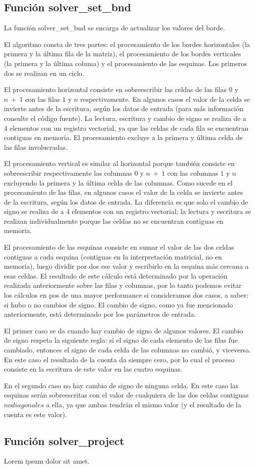 \subsection{Función solver\_set\_bnd}
La función solver\_set\_bnd se encarga de actualizar los valores del borde.
\par El algoritmo consta de tres partes: el procesamiento de los bordes horizontales (la primera y la última fila de la matriz), el procesamiento de los bordes verticales (la primera y la última columa) y el procesamiento de las esquinas. Los primeros dos se realizan en un ciclo.
\par El procesamiento horizontal consiste en sobreescribir las celdas de las filas $0$ y $n\ +\ 1$ con las filas $1$ y $n$ respectivamente. En algunos casos el valor de la celda se invierte antes de la escritura, según los datos de entrada (para más información consulte el código fuente). La lectura, escritura y cambio de signo se realiza de a $4$ elementos con un registro vectorial, ya que las celdas de cada fila se encuentran contiguas en memoria. El procesamiento excluye a la primera y última celda de las filas involucradas.
\par El procesamiento vertical es similar al horizontal porque también consiste en sobreescribir respectivamente las columnas $0$ y $n\ +\ 1$ con las columnas $1$ y $n$ excluyendo la primera y la última celda de las columnas. Como sucede en el procesamiento de las filas, en algunos casos el valor de la celda se invierte antes de la escritura, según los datos de entrada. La diferencia es que solo el cambio de signo se realiza de a $4$ elementos con un registro vectorial; la lectura y escritura se realizan individualmente porque las celdas no se encuentran contiguas en memoria.
\par El procesamiento de las esquinas consiste en sumar el valor de las dos celdas contiguas a cada esquina (contiguas en la interpretación matricial, no en memoria), luego dividir por dos ese valor y escribirlo en la esquina más cercana a esas celdas. El resultado de este cálculo está determinado por la operación realizada anteriormente sobre las filas y columnas, por lo tanto podemos evitar los cálculos en pos de una mayor performance si consideramos dos casos, a saber: si hubo o no cambios de signo. El cambio de signo, como ya fue mencionado anteriormente, está determinado por los parámetros de entrada.
\par El primer caso se da cuando hay cambio de signo de algunos valores. El cambio de signo respeta la siguiente regla: si el signo de cada elemento de las filas fue cambiado, entonces el signo de cada celda de las columnas no cambió, y viceversa. En este caso el resultado de la cuenta da siempre cero, por lo cual el proceso consiste en la escritura de este valor en las cuatro esquinas.
\par En el segundo caso no hay cambio de signo de ninguna celda. En este caso las esquinas serán sobreescritas con el valor de cualquiera de las dos celdas contiguas \(no diagonales\) a ella, ya que ambas tendrán el mismo valor (y el resultado de la cuenta es este valor).
\subsection{Función solver\_project}
Lorem ipsum dolor sit amet.

